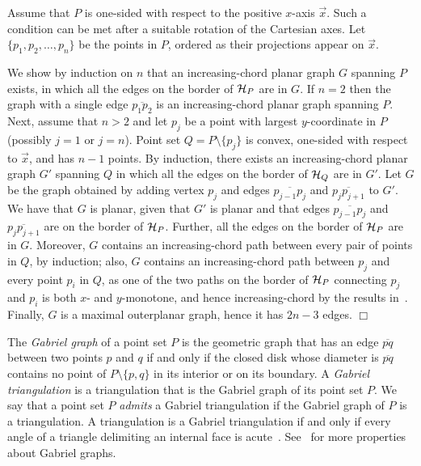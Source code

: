 \documentclass{llncs}
\renewenvironment{proof}
{{\bf Proof:}}{\hspace*{\fill}$\Box$\par\vspace{2mm}}
\begin{document}
\begin{proof}
Assume that $P$ is one-sided with respect to the positive $x$-axis ${\vec x}$. Such a condition can be met after a suitable rotation of the Cartesian axes. Let $\{p_1,p_2,\dots,p_n\}$ be the points in $P$, ordered as their projections appear on ${\vec x}$.

We show by induction on $n$ that an increasing-chord planar graph $G$ spanning $P$ exists, in which all the edges on the border of ${\cal H}_P$ are in $G$. If $n=2$ then the graph with a single edge $\overline{p_1p_2}$ is an increasing-chord planar graph spanning $P$. Next, assume that $n>2$ and let $p_j$ be a point with largest $y$-coordinate in $P$ (possibly $j=1$ or $j=n$). Point set $Q=P\setminus\{p_j\}$ is convex, one-sided with respect to ${\vec x}$, and has $n-1$ points. By induction, there exists an increasing-chord planar graph $G'$ spanning $Q$ in which all the edges on the border of ${\cal H}_{Q}$ are in $G'$. Let $G$ be the graph obtained by adding vertex $p_j$ and edges $\overline{p_{j-1}p_j}$ and $\overline{p_jp_{j+1}}$ to $G'$. We have that $G$ is planar, given that $G'$ is planar and that edges $\overline{p_{j-1}p_j}$ and $\overline{p_jp_{j+1}}$ are on the border of ${\cal H}_{P}$. Further, all the edges on the border of ${\cal H}_{P}$ are in $G$. Moreover, $G$ contains an increasing-chord path between every pair of points in $Q$, by induction; also, $G$ contains an increasing-chord path between $p_j$ and every point $p_i$ in $Q$, as one of the two paths on the border of ${\cal H}_{P}$ connecting $p_j$ and $p_i$ is both $x$- and $y$-monotone, and hence increasing-chord by the results in~\cite{acglp-sag-12}. Finally, $G$ is a maximal outerplanar graph, hence it has $2n-3$ edges.
\end{proof}

The {\em Gabriel graph} of a point set $P$ is the geometric graph that has an edge $\overline{pq}$ between two points $p$ and $q$ if and only if the closed disk whose diameter is $\overline{pq}$ contains no point of $P\setminus\{p,q\}$ in its interior or on its boundary. A {\em Gabriel triangulation} is a triangulation that is the Gabriel graph of its point set $P$. We say that a point set $P$ {\em admits} a Gabriel triangulation if the Gabriel graph of $P$ is a triangulation. A triangulation is a Gabriel triangulation if and only if every angle of a triangle delimiting an internal face is acute~\cite{gs-nsagva-69}. See~\cite{gs-nsagva-69,gd-handbook,ms-pgg-80} for more properties about Gabriel graphs.
\end{document}
